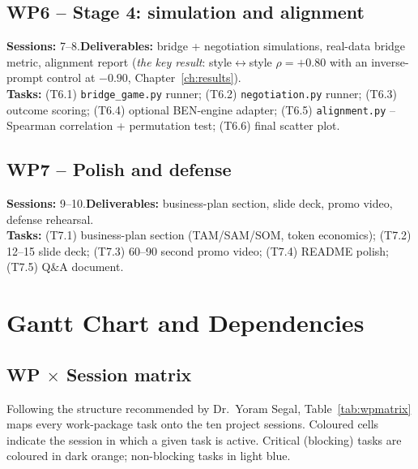 \documentclass[11pt, a4paper, oneside, openany]{report}
\begin{document}
\section*{WP6 -- Stage 4: simulation and alignment}
\textbf{Sessions:} 7--8.\quad \textbf{Deliverables:} bridge + negotiation simulations, real-data bridge metric, alignment report (\emph{the key result}: style$\leftrightarrow$style $\rho = +0.80$ with an inverse-prompt control at $-0.90$, Chapter~\ref{ch:results}).\\
\textbf{Tasks:} (T6.1) \texttt{bridge\_game.py} runner; (T6.2) \texttt{negotiation.py} runner; (T6.3) outcome scoring; (T6.4) optional BEN-engine adapter; (T6.5) \texttt{alignment.py} -- Spearman correlation + permutation test; (T6.6) final scatter plot.

\section*{WP7 -- Polish and defense}
\textbf{Sessions:} 9--10.\quad \textbf{Deliverables:} business-plan section, slide deck, promo video, defense rehearsal.\\
\textbf{Tasks:} (T7.1) business-plan section (TAM/SAM/SOM, token economics); (T7.2) 12--15 slide deck; (T7.3) 60--90 second promo video; (T7.4) README polish; (T7.5) Q\&A document.

\iffalse
\chapter{Gantt Chart and Dependencies}
\label{ch:gantt}

\section{WP $\times$ Session matrix}

Following the structure recommended by Dr.\ Yoram Segal, Table~\ref{tab:wpmatrix} maps every work-package task onto the ten project sessions. Coloured cells indicate the session in which a given task is active. Critical (blocking) tasks are coloured in dark orange; non-blocking tasks in light blue.
\end{document}
